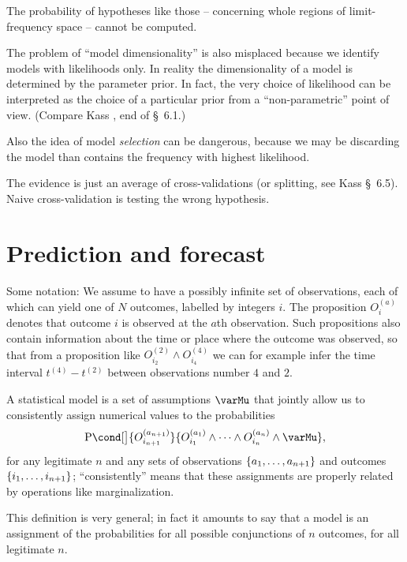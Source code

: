 \documentclass[\ifafour a4paper,12pt,\else a5paper,10pt,\fi%
onecolumn,oneside,article,%
british%
]{memoir}
\theoremstyle{remark}
\theoremstyle{innote}
\newcommand*{\citey}{\parencites*}
\DeclarePairedDelimiter\set{\{}{\}}
\newcommand*{\p}{\mathrm{P}}%
\renewcommand*{\|}{\nonscript\,\vert\nonscript\;\mathopen{}}
\newcommand*{\sect}{\S}%
\newcommand*{\yO}[2]{O^{(#1)}_{#2}}
\newcommand*{\yM}{\varMu}
\begin{document}
The probability of hypotheses like those -- concerning whole regions of
limit-frequency space -- cannot be computed.

The problem of \enquote{model dimensionality} is also misplaced because we
identify models with likelihoods only. In reality the dimensionality of a
model is determined by the parameter prior. In fact, the very choice of
likelihood can be interpreted as the choice of a particular prior from a
\enquote{non-parametric} point of view. (Compare Kass \citey{kassetal1995},
end of \sect~6.1.)

Also the idea of model \emph{selection} can be dangerous, because we may be
discarding the model than contains the frequency with highest likelihood.

The evidence is just an average of cross-validations (or splitting, see
Kass \sect~6.5). Naive cross-validation is testing the wrong hypothesis.



\section{Prediction and forecast}
\label{sec:intro}

Some notation: We assume to have a possibly infinite set of observations,
each of which can yield one of $N$ outcomes, labelled by integers $i$. The
proposition $\yO{a}{i}$ denotes that outcome $i$ is observed at the $a$th
observation. Such propositions also contain information about the time or
place where the outcome was observed, so that from a proposition like
$\yO{2}{i_2} \land \yO{4}{i_4}$ we can for example infer the time interval
$t^{(4)}-t^{(2)}$ between observations number $4$ and $2$.

A statistical model is a set of assumptions $\yM$ that jointly allow us to
consistently assign numerical values to the probabilities
\begin{equation}
  \label{eq:def_statmod}
  \p\cond[\big]{\yO{a_{n+1}}{i_{n+1}}}{
  \yO{a_{1}}{i_{1}} \land \dotsb \land \yO{a_{n}}{i_{n}} \land \yM},
\end{equation}
for any legitimate $n$ and any sets of observations
$\set{a_{1}, \dotsc, a_{n+1}}$ and outcomes $\set{i_{1}, \dotsc, i_{n+1}}$;
\enquote{consistently} means that these assignments are properly related by
operations like marginalization.

This definition is very general; in fact it amounts to say that a model is
an assignment of the probabilities for all possible conjunctions of $n$
outcomes, for all legitimate $n$.
\end{document}

